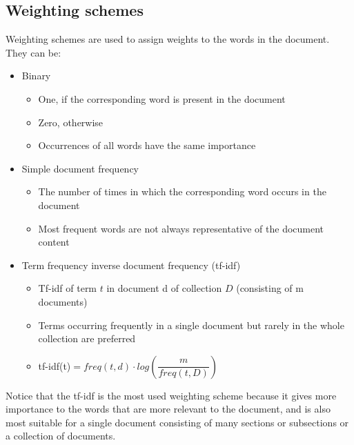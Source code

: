 \subsection{Weighting schemes}
Weighting schemes are used to assign weights to the words in the
document. They can be:
\begin{itemize}
    \item  Binary
        \begin{itemize}
            \item One, if the corresponding word is present in the document
            \item Zero, otherwise
            \item Occurrences of all words have the same importance
        \end{itemize}
    \item Simple document frequency
        \begin{itemize}
            \item The number of times in which the corresponding word occurs in the document
            \item Most frequent words are not always representative of the document content
        \end{itemize}
    \item Term frequency inverse document frequency (tf-idf)
        \begin{itemize}
            \item Tf-idf of term $t$ in document d of collection $D$ (consisting of m documents)
            \item Terms occurring frequently in a single document but rarely in the whole collection are preferred
            \item  tf-idf(t)$=   freq(t,d)\cdot log(\dfrac{m}{freq(t,D)} ) $
        \end{itemize}
\end{itemize}
Notice that the tf-idf is the most used weighting scheme because it 
gives more importance to the words that are more relevant to the 
document, and is also most suitable for a single document consisting
of many sections or subsections or a collection of documents.


 
